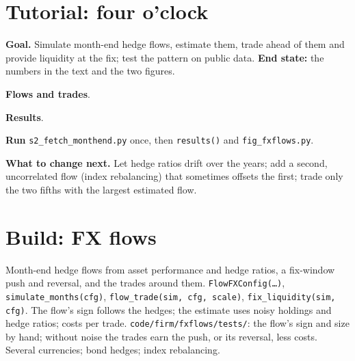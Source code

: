 \section{Tutorial: four o'clock}\label{tut:s2:fx-flow-strategies:tut}

\begin{tutorial}
\textbf{Goal.} Simulate month-end hedge flows, estimate them, trade ahead of them and provide liquidity at the fix; test the pattern on public data.
\textbf{End state:} the numbers in the text and the two figures.
\begin{tutsteps}
\item \textbf{Flows and trades}.
\label{lst:s2:fx-flow-strategies:model}
\item \textbf{Results}.
\label{lst:s2:fx-flow-strategies:results}
\item \textbf{Run} \texttt{s2\_fetch\_monthend.py} once, then \texttt{results()} and \texttt{fig\_fxflows.py}.
\end{tutsteps}
\textbf{What to change next.} Let hedge ratios drift over the years; add a second, uncorrelated flow (index rebalancing) that sometimes offsets the
first; trade only the two fifths with the largest estimated flow.
\end{tutorial}

\section{Build: FX flows}\label{bld:s2:fx-flow-strategies:fxflows}

\begin{build}
 Month-end hedge flows from asset performance and hedge ratios, a fix-window push and reversal, and the trades around them.
 \texttt{FlowFXConfig(\dots)}, \texttt{simulate\_months(cfg)}, \texttt{flow\_trade(sim, cfg, scale)},
\texttt{fix\_liquidity(sim, cfg)}.
 The flow's sign follows the hedges; the estimate uses noisy holdings and hedge ratios; costs per trade.
 \texttt{code/firm/fxflows/tests/}: the flow's sign and size by hand; without noise the trades earn the push, or its
reversal, less costs.
 Several currencies; bond hedges; index rebalancing.
\end{build}


